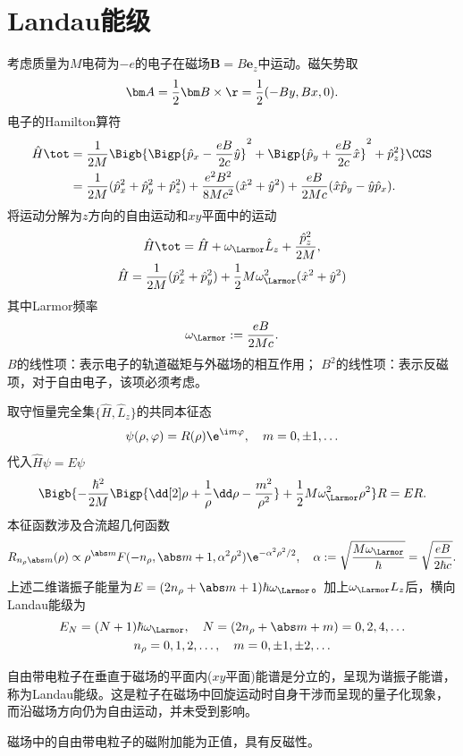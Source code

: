 \section{Landau能级}
考虑质量为$M$电荷为$-e$的电子在磁场$\bm B=B\bm e_z$中运动。磁矢势取
\[
	\bm A=\frac12\bm B\times\r=\frac12(-By,Bx,0).
\]
电子的Hamilton算符
\begin{align*}
	\hat H\tot & =\frac1{2M}\Bigb{\Bigp{\hat p_x-\frac{eB}{2c}\hat y}^2+\Bigp{\hat p_y+\frac{eB}{2c}\hat x}^2+\hat p_z^2}\CGS\\
	           & =\frac1{2M}(\hat p_x^2+\hat p_y^2+\hat p_z^2)+\frac{e^2B^2}{8Mc^2}(\hat x^2+\hat y^2)+\frac{eB}{2Mc}(\hat x\hat p_y-\hat y\hat p_x).
\end{align*}
将运动分解为$z$方向的自由运动和$xy$平面中的运动
\begin{gather*}
	\hat H\tot=\hat H+\omega_\Larmor\hat L_z+\frac{\hat p_z^2}{2M},\\
	\hat H=\frac1{2M}(\hat p_x^2+\hat p_y^2)+\frac12M\omega_\Larmor^2(\hat x^2+\hat y^2)
\end{gather*}
其中Larmor频率
\[
	\omega_\Larmor:=\frac{eB}{2Mc}.
\]
$B$的线性项：表示电子的轨道磁矩与外磁场的相互作用；
$B^2$的线性项：表示反磁项，对于自由电子，该项必须考虑。

取守恒量完全集$\{\hat H,\hat L_z\}$的共同本征态 %
\[
	\psi(\rho,\varphi)=R(\rho)\e^{\i m\varphi},\quad m=0,\pm 1,\ldots
\]
代入$\hat H\psi=E\psi$
\[
	\Bigb{-\frac{\hbar^2}{2M}\Bigp{\dd[2]\rho+\frac1\rho\dd\rho-\frac{m^2}{\rho^2}}+\frac12M\omega_\Larmor^2\rho^2}R=ER.
\]
本征函数涉及合流超几何函数
\[
R_{n_\rho\abs m}(\rho)\propto\rho^{\abs m}F(-n_\rho,\abs m+1,\alpha^2\rho^2)\e^{-\alpha^2\rho^2/2},\quad \alpha:=\sqrt{\frac{M\omega_\Larmor}\hbar}=\sqrt{\frac{eB}{2\hbar  c}}.
\]
上述二维谐振子能量为$E=(2n_\rho+\abs m+1)\hbar\omega_\Larmor$。加上$\omega_\Larmor L_z$后，横向Landau能级为
\begin{gather*}
	E_N=(N+1)\hbar\omega_\Larmor,\quad N=(2n_\rho+\abs m+m)=0,2,4,\ldots\\
	n_\rho=0,1,2,\ldots,\quad m=0,\pm 1,\pm 2,\ldots
\end{gather*}

自由带电粒子在垂直于磁场的平面内($xy$平面)能谱是分立的，呈现为谐振子能谱，称为Landau能级。这是粒子在磁场中回旋运动时自身干涉而呈现的量子化现象，而沿磁场方向仍为自由运动，并未受到影响。

磁场中的自由带电粒子的磁附加能为正值，具有反磁性。
